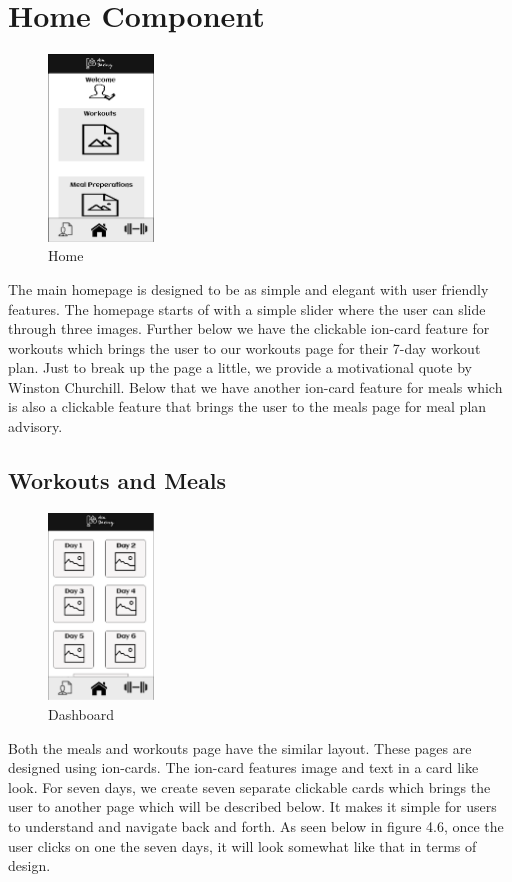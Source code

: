 \documentclass[a4paper,12pt]{report}
\begin{document}
\section{Home Component}
\begin{figure}
\centering
\includegraphics[width=0.25\textwidth]{images/homePageBorder.png}
\caption{\label{fig:homepage}Home}
\end{figure}
The main homepage is designed to be as simple and elegant with user friendly features. The homepage starts of with a simple slider where the user can slide through three images.
Further below we have the clickable ion-card feature for workouts which brings the user to our workouts page for their 7-day workout plan. Just to break up the page a little, we provide a motivational quote by Winston Churchill. Below that we have another ion-card feature for meals which is also a clickable feature that brings the user to the meals page for meal plan advisory.
\\
\newpage
\subsection{Workouts and Meals}
\begin{figure}
\centering
\includegraphics[width=0.25\textwidth]{images/days.png}
\caption{\label{fig:homepage}Dashboard}
\end{figure}
Both the meals and workouts page have the similar layout. These pages are designed using ion-cards. The ion-card features image and text in a card like look. For seven days, we create seven separate clickable cards which brings the user to another page which will be described below. It makes it simple for users to understand and navigate back and forth. As seen below in figure 4.6, once the user clicks on one the seven days, it will look somewhat like that in terms of design.\\\\\\\
\end{document}
